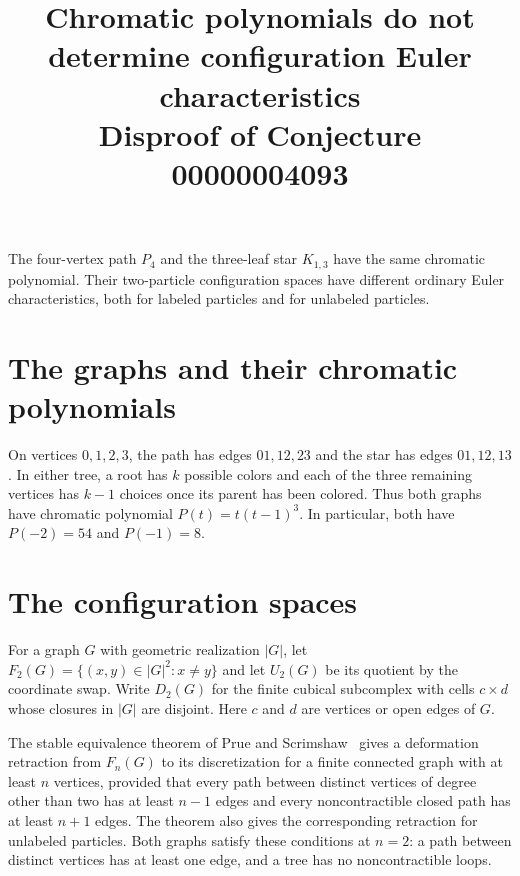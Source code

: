 \documentclass[11pt]{article}
\title{Chromatic polynomials do not determine configuration Euler characteristics\\[2pt]
  \large Disproof of Conjecture 00000004093}
\author{}
\date{}
\begin{document}
\maketitle

\noindent
The four-vertex path $P_4$ and the three-leaf star $K_{1,3}$ have the same
chromatic polynomial. Their two-particle configuration spaces have
different ordinary Euler characteristics, both for labeled particles and
for unlabeled particles.

\section*{The graphs and their chromatic polynomials}

On vertices $0,1,2,3$, the path has edges $01,12,23$ and the star has edges
$01,12,13$. In either tree, a root has $k$ possible colors and each of the
three remaining vertices has $k-1$ choices once its parent has been colored.
Thus both graphs have chromatic polynomial $P(t)=t(t-1)^3$. In particular,
both have $P(-2)=54$ and $P(-1)=8$.

\section*{The configuration spaces}

For a graph $G$ with geometric realization $|G|$, let
$F_2(G)=\{(x,y)\in |G|^2:x\ne y\}$ and let $U_2(G)$ be its quotient by the
coordinate swap. Write $D_2(G)$ for the finite cubical subcomplex with cells
$c\times d$ whose closures in $|G|$ are disjoint. Here $c$ and $d$ are
vertices or open edges of $G$.

The stable equivalence theorem of Prue and Scrimshaw~\cite[Theorem~3.2]{ps}
gives a deformation retraction from $F_n(G)$ to its discretization for a
finite connected graph with at least $n$ vertices, provided that every path
between distinct vertices of degree other than two has at least $n-1$
edges and every noncontractible closed path has at least $n+1$ edges.
The theorem also gives the corresponding retraction for unlabeled particles.
Both graphs satisfy these conditions at $n=2$: a path between distinct
vertices has at least one edge, and a tree has no noncontractible loops.
\end{document}
